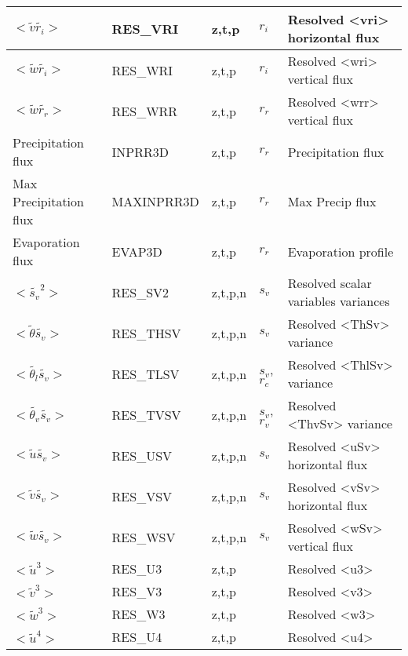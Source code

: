 \begin{longtable}[c]{|p{}|p{}|p{}|p{}|p{}|}
$<\tilde{v}\tilde{r_i}>$                             & RES\_VRI   & z,t,p   & $r_i$ & Resolved <vri> horizontal flux \\\hline
$<\tilde{w}\tilde{r_i}>$                             & RES\_WRI   & z,t,p   & $r_i$ & Resolved <wri> vertical flux \\\hline
$<\tilde{w}\tilde{r_r}>$                             & RES\_WRR   & z,t,p   & $r_r$ & Resolved <wrr> vertical flux \\\hline
Precipitation flux                                   & INPRR3D    & z,t,p   & $r_r$ & Precipitation flux \\\hline
Max Precipitation flux                               & MAXINPRR3D & z,t,p   & $r_r$ & Max Precip flux \\\hline
Evaporation flux                                     & EVAP3D     & z,t,p   & $r_r$ & Evaporation profile \\\hline
$<\tilde{s_v}^2>$                                    & RES\_SV2   & z,t,p,n & $s_v$ & Resolved scalar variables variances \\\hline
$<\tilde{\theta}\tilde{s_v}>$                        & RES\_THSV  & z,t,p,n & $s_v$ & Resolved <ThSv> variance \\\hline
$<\tilde{\theta_l}\tilde{s_v}>$                      & RES\_TLSV  & z,t,p,n & $s_v$, $r_c$ & Resolved <ThlSv> variance \\\hline
$<\tilde{\theta_v}\tilde{s_v}>$                      & RES\_TVSV  & z,t,p,n & $s_v$, $r_v$ & Resolved <ThvSv> variance \\\hline
$<\tilde{u}\tilde{s_v}>$                             & RES\_USV   & z,t,p,n & $s_v$ & Resolved <uSv> horizontal flux \\\hline
$<\tilde{v}\tilde{s_v}>$                             & RES\_VSV   & z,t,p,n & $s_v$ & Resolved <vSv> horizontal flux \\\hline
$<\tilde{w}\tilde{s_v}>$                             & RES\_WSV   & z,t,p,n & $s_v$ & Resolved <wSv> vertical flux \\\hline
$<\tilde{u}^3>$                                      & RES\_U3    & z,t,p   &       & Resolved <u3> \\\hline
$<\tilde{v}^3>$                                      & RES\_V3    & z,t,p   &       & Resolved <v3> \\\hline
$<\tilde{w}^3>$                                      & RES\_W3    & z,t,p   &       & Resolved <w3> \\\hline
$<\tilde{u}^4>$                                      & RES\_U4    & z,t,p   &       & Resolved <u4> \\\hline

\end{longtable}
